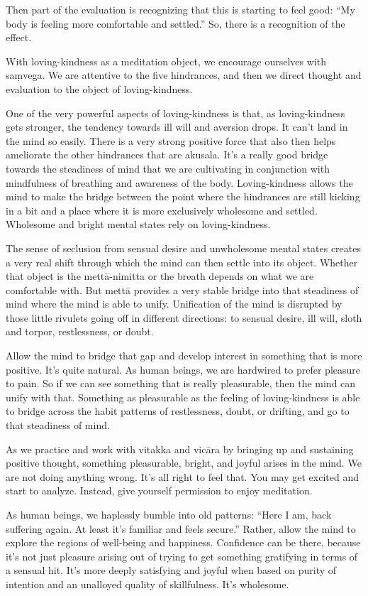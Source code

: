 Then part of the evaluation is recognizing that this is starting to feel
good: “My body is feeling more comfortable and settled.” So, there is a
recognition of the effect.

With loving-kindness as a meditation object, we encourage ourselves with
saṃvega. We are attentive to the five hindrances, and then we direct
thought and evaluation to the object of loving-kindness.

One of the very powerful aspects of loving-kindness is that, as
loving-kindness gets stronger, the tendency towards ill will and
aversion drops. It can’t land in the mind so easily. There is a very
strong positive force that also then helps ameliorate the other
hindrances that are akusala. It’s a really good bridge towards the
steadiness of mind that we are cultivating in conjunction with
mindfulness of breathing and awareness of the body. Loving-kindness
allows the mind to make the bridge between the point where the
hindrances are still kicking in a bit and a place where it is more
exclusively wholesome and settled. Wholesome and bright mental states
rely on loving-kindness.

The sense of seclusion from sensual desire and unwholesome mental states
creates a very real shift through which the mind can then settle into
its object. Whether that object is the mettā-nimitta or the breath
depends on what we are comfortable with. But mettā provides a very
stable bridge into that steadiness of mind where the mind is able to
unify. Unification of the mind is disrupted by those little rivulets
going off in different directions: to sensual desire, ill will, sloth
and torpor, restlessness, or doubt.

Allow the mind to bridge that gap and develop interest in something that
is more positive. It’s quite natural. As human beings, we are hardwired
to prefer pleasure to pain. So if we can see something that is really
pleasurable, then the mind can unify with that. Something as pleasurable
as the feeling of loving-kindness is able to bridge across the habit
patterns of restlessness, doubt, or drifting, and go to that steadiness
of mind.

As we practice and work with vitakka and vicāra by bringing up and
sustaining positive thought, something pleasurable, bright, and joyful
arises in the mind. We are not doing anything wrong. It’s all right to
feel that. You may get excited and start to analyze. Instead, give
yourself permission to enjoy meditation.

As human beings, we haplessly bumble into old patterns: “Here I am, back
suffering again. At least it’s familiar and feels secure.” Rather, allow
the mind to explore the regions of well-being and happiness. Confidence
can be there, because it’s not just pleasure arising out of trying to
get something gratifying in terms of a sensual hit. It’s more deeply
satisfying and joyful when based on purity of intention and an unalloyed
quality of skillfulness. It’s wholesome.

